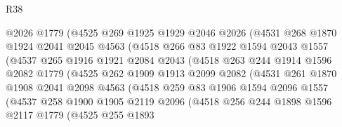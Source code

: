 \begin{lexlean}{R38}
\begin{coremodule}
                    @2026
                    @1779
                    (@4525
                      @269
                      @1925
                      @1929
                      @2046
                      @2026
                      (@4531
                        @268
                        @1870
                        @1924
                        @2041
                        @2045
                        @4563
                        (@4518
                          @266
                          @83
                          @1922
                          @1594
                          @2043
                          @1557
                          (@4537
                            @265
                            @1916
                            @1921
                            @2084
                            @2043
                            (@4518
                              @263
                              @244
                              @1914
                              @1596
                              @2082
                              @1779
                              (@4525
                                @262
                                @1909
                                @1913
                                @2099
                                @2082
                                (@4531
                                  @261
                                  @1870
                                  @1908
                                  @2041
                                  @2098
                                  @4563
                                  (@4518
                                    @259
                                    @83
                                    @1906
                                    @1594
                                    @2096
                                    @1557
                                    (@4537
                                      @258
                                      @1900
                                      @1905
                                      @2119
                                      @2096
                                      (@4518
                                        @256
                                        @244
                                        @1898
                                        @1596
                                        @2117
                                        @1779
                                        (@4525
                                          @255
                                          @1893

\end{coremodule}
\end{lexlean}
